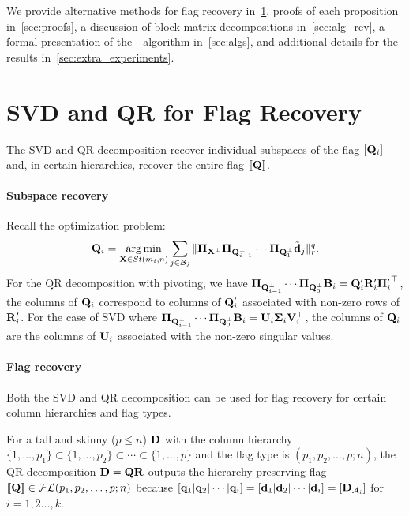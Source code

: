 


We provide 
alternative methods for flag recovery in~\cref{sec:svd_and_qr},
proofs of each proposition in~\cref{sec:proofs}, a discussion of block matrix decompositions in~\cref{sec:alg_rev}, a formal presentation of the~\algname~algorithm in~\cref{sec:algs}, and additional details for the results in~\cref{sec:extra_experiments}.

\section{SVD and QR for Flag Recovery}\label{sec:svd_and_qr}
The SVD and QR decomposition recover individual subspaces of the flag $[\mathbf{Q}_i]$ and, in certain hierarchies, recover the entire flag $[\![\mathbf{Q}]\!]$. 

\paragraph{Subspace recovery} Recall the optimization problem:
\begin{equation}
    \mathbf{Q}_i =  \operatorname*{arg\min}_{\mathbf{X} \in St(m_i,n)} \sum_{j \in \mathcal{B}_j}\| \boldsymbol{\Pi}_{\mathbf{X}^\perp} \boldsymbol{\Pi}_{\mathbf{Q}^\perp_{i-1}} \cdots \boldsymbol{\Pi}_{\mathbf{Q}^\perp_1} \tilde{\mathbf{d}}_j \|_r^q.
\end{equation}
For the QR decomposition with pivoting, we have $\boldsymbol{\Pi}_{\mathbf{Q}^\perp_{i-1}} \cdots \boldsymbol{\Pi}_{\mathbf{Q}^\perp_0} \mathbf{B}_i = \mathbf{Q}_i' \mathbf{R}_i'{\boldsymbol{\Pi}_i'}^\top$, the columns of $\mathbf{Q}_i$ correspond to columns of $\mathbf{Q}_i'$ associated with non-zero rows of $\mathbf{R}_i'$. For the case of SVD where $\boldsymbol{\Pi}_{\mathbf{Q}^\perp_{i-1}} \cdots \boldsymbol{\Pi}_{\mathbf{Q}^\perp_0} \mathbf{B}_i = \mathbf{U}_i \bm{\Sigma}_i \mathbf{V}_i^\top$, the columns of $\mathbf{Q}_i$ are the columns of $\mathbf{U}_i$ associated with the non-zero singular values.


\paragraph{Flag recovery} Both the SVD and QR decomposition can be used for flag recovery for certain column hierarchies and flag types.
\begin{exmp}[QR decomposition]
    For a tall and skinny ($p \leq n$) $\mathbf{D}$ with the column hierarchy $\{1,\dots,p_1\}\subset \{1,\dots,p_2\} \subset \cdots \subset \{1,\dots,p\}$ and the flag type is $(p_1,p_2,\dots,p;n)$, the QR decomposition $\mathbf{D} = \mathbf{Q} \mathbf{R}$ outputs the hierarchy-preserving flag $[\![\mathbf{Q}]\!] \in \mathcal{FL}(p_1,p_2,\dots,p;n)$ because $[\mathbf{q}_1 | \mathbf{q}_2|\cdots |\mathbf{q}_i] = [\mathbf{d}_1 | \mathbf{d}_2|\cdots |\mathbf{d}_i]=[\mathbf{D}_{\mathcal{A}_i}]$ for $i=1,2\dots,k$.
\end{exmp}

